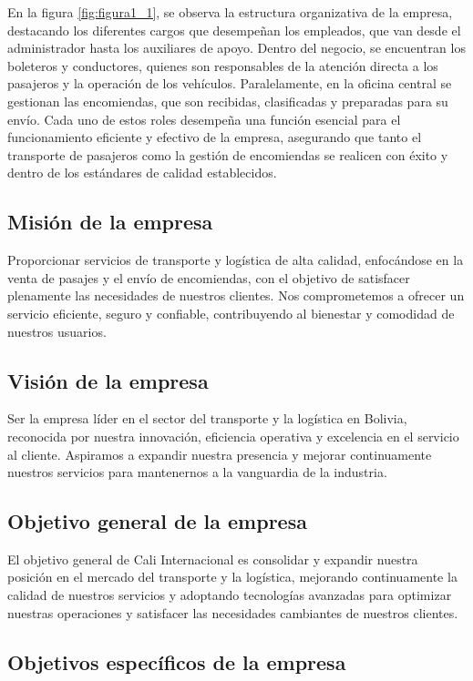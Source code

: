 	En la figura \ref{fig:figura1_1}, se observa la estructura organizativa de la empresa, destacando los diferentes cargos que desempeñan los empleados, que van desde el administrador hasta los auxiliares de apoyo. Dentro del negocio, se encuentran los boleteros y conductores, quienes son responsables de la atención directa a los pasajeros y la operación de los vehículos. Paralelamente, en la oficina central se gestionan las encomiendas, que son recibidas, clasificadas y preparadas para su envío. Cada uno de estos roles desempeña una función esencial para el funcionamiento eficiente y efectivo de la empresa, asegurando que tanto el transporte de pasajeros como la gestión de encomiendas se realicen con éxito y dentro de los estándares de calidad establecidos.
	
	\subsection*{Misión de la empresa}
	
	Proporcionar servicios de transporte y logística de alta calidad, enfocándose en la venta de pasajes y el envío de encomiendas, con el objetivo de satisfacer plenamente las necesidades de nuestros clientes. Nos comprometemos a ofrecer un servicio eficiente, seguro y confiable, contribuyendo al bienestar y comodidad de nuestros usuarios.
	
	\subsection*{Visión de la empresa}
	
	Ser la empresa líder en el sector del transporte y la logística en Bolivia, reconocida por nuestra innovación, eficiencia operativa y excelencia en el servicio al cliente. Aspiramos a expandir nuestra presencia y mejorar continuamente nuestros servicios para mantenernos a la vanguardia de la industria.
	
	\subsection*{Objetivo general de la empresa}
	El objetivo general de Cali Internacional es consolidar y expandir nuestra posición en el mercado del transporte y la logística, mejorando continuamente la calidad de nuestros servicios y adoptando tecnologías avanzadas para optimizar nuestras operaciones y satisfacer las necesidades cambiantes de nuestros clientes.
	
	\subsection*{Objetivos específicos de la empresa}
	
